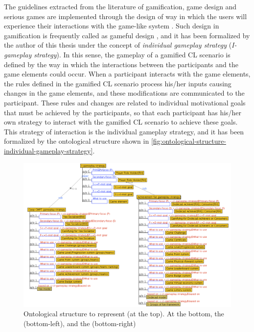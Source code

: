The guidelines extracted from the literature of gamification, game design and serious games are implemented through the design of way in which the users will experience their interactions with the game-like system \cite{FabricatoreLopez2014, NackeDrachenGobel2010, Schell2008}. Such design in gamification is frequently called as gameful design \cite{DeterdingDixonKhaledNacke2011, DichevDichevaAngelovaAgre2014}, and it has been formalized by the author of this thesis under the concept of \emph{individual gameplay strategy} (\emph{I-gameplay strategy}). In this sense, the gameplay of a gamified CL scenario is defined by the way in which the interactions between the participants and the game elements could occur. When a participant interacts with the game elements, the rules defined in the gamified CL scenario process his/her inputs causing changes in the game elements, and these modifications are communicated to the participant. These rules and changes are related to individual motivational goals that must be achieved by the participants, so that each participant has his/her own strategy to interact with the gamified CL scenario to achieve these goals. This strategy of interaction is the individual gameplay strategy, and it has been formalized by the ontological structure shown in \autoref{fig:ontological-structure-individual-gameplay-strategy}.

\begin{figure}[!htbp]
 \caption[Ontological structure to represent individual gameplay strategy]{Ontological structure to represent  (at the top). At the bottom, the  (bottom-left), and the  (bottom-right)}
 \label{fig:ontological-structure-individual-gameplay-strategy}
 \centering
 \includegraphics[width=1\textwidth]{images/chap-ontogacles1/ontological-structure-individual-gameplay-strategy.png} 
 \fautor
\end{figure}

